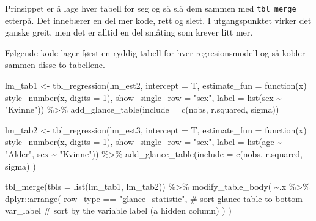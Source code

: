 \documentclass[
  letterpaper,
  DIV=11,
  numbers=noendperiod]{scrreprt}
\newenvironment{Shaded}{\begin{snugshade}}{\end{snugshade}}
\newcommand{\AttributeTok}[1]{\textcolor[rgb]{0.40,0.45,0.13}{#1}}
\newcommand{\CommentTok}[1]{\textcolor[rgb]{0.37,0.37,0.37}{#1}}
\newcommand{\ControlFlowTok}[1]{\textcolor[rgb]{0.00,0.23,0.31}{#1}}
\newcommand{\DecValTok}[1]{\textcolor[rgb]{0.68,0.00,0.00}{#1}}
\newcommand{\FunctionTok}[1]{\textcolor[rgb]{0.28,0.35,0.67}{#1}}
\newcommand{\NormalTok}[1]{\textcolor[rgb]{0.00,0.23,0.31}{#1}}
\newcommand{\OtherTok}[1]{\textcolor[rgb]{0.00,0.23,0.31}{#1}}
\newcommand{\SpecialCharTok}[1]{\textcolor[rgb]{0.37,0.37,0.37}{#1}}
\newcommand{\StringTok}[1]{\textcolor[rgb]{0.13,0.47,0.30}{#1}}
\theoremstyle{definition}
\theoremstyle{remark}
\begin{document}
Prinsippet er å lage hver tabell for seg og så slå dem sammen med
\texttt{tbl\_merge} etterpå. Det innebærer en del mer kode, rett og
slett. I utgangspunktet virker det ganske greit, men det er alltid en
del småting som krever litt mer.

Følgende kode lager først en ryddig tabell for hver regresionsmodell og
så kobler sammen disse to tabellene.

\begin{Shaded}
\begin{Highlighting}[]
\NormalTok{lm\_tab1 }\OtherTok{\textless{}{-}} \FunctionTok{tbl\_regression}\NormalTok{(lm\_est2, }\AttributeTok{intercept =}\NormalTok{ T, }
                          \AttributeTok{estimate\_fun =} \ControlFlowTok{function}\NormalTok{(x) }\FunctionTok{style\_number}\NormalTok{(x, }\AttributeTok{digits =} \DecValTok{1}\NormalTok{),}
                          \AttributeTok{show\_single\_row =} \StringTok{"sex"}\NormalTok{,}
                          \AttributeTok{label =} \FunctionTok{list}\NormalTok{(sex }\SpecialCharTok{\textasciitilde{}} \StringTok{"Kvinne"}\NormalTok{)) }\SpecialCharTok{\%\textgreater{}\%} 
    \FunctionTok{add\_glance\_table}\NormalTok{(}\AttributeTok{include =} \FunctionTok{c}\NormalTok{(nobs, r.squared, sigma))}
                     
\NormalTok{lm\_tab2 }\OtherTok{\textless{}{-}} \FunctionTok{tbl\_regression}\NormalTok{(lm\_est3, }\AttributeTok{intercept =}\NormalTok{ T,}
                          \AttributeTok{estimate\_fun =} \ControlFlowTok{function}\NormalTok{(x) }\FunctionTok{style\_number}\NormalTok{(x, }\AttributeTok{digits =} \DecValTok{1}\NormalTok{), }
                          \AttributeTok{show\_single\_row =} \StringTok{"sex"}\NormalTok{,}
                          \AttributeTok{label =} \FunctionTok{list}\NormalTok{(age }\SpecialCharTok{\textasciitilde{}} \StringTok{"Alder"}\NormalTok{, sex }\SpecialCharTok{\textasciitilde{}} \StringTok{"Kvinne"}\NormalTok{)) }\SpecialCharTok{\%\textgreater{}\%} 
    \FunctionTok{add\_glance\_table}\NormalTok{(}\AttributeTok{include =} \FunctionTok{c}\NormalTok{(nobs, r.squared, sigma)}
\NormalTok{  )}


\FunctionTok{tbl\_merge}\NormalTok{(}\AttributeTok{tbls =} \FunctionTok{list}\NormalTok{(lm\_tab1, lm\_tab2)) }\SpecialCharTok{\%\textgreater{}\%} 
  \FunctionTok{modify\_table\_body}\NormalTok{(}
    \SpecialCharTok{\textasciitilde{}}\NormalTok{.x }\SpecialCharTok{\%\textgreater{}\%} 
\NormalTok{      dplyr}\SpecialCharTok{::}\FunctionTok{arrange}\NormalTok{(}
\NormalTok{        row\_type }\SpecialCharTok{==} \StringTok{"glance\_statistic"}\NormalTok{, }\CommentTok{\# sort glance table to bottom}
\NormalTok{        var\_label                       }\CommentTok{\# sort by the variable label (a hidden column) }
\NormalTok{      )}
\NormalTok{  )}
\end{Highlighting}
\end{Shaded}
\end{document}
